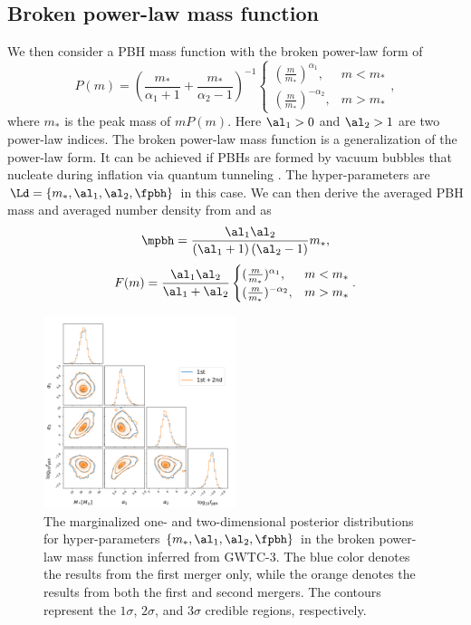\documentclass[
reprint,           %
superscriptaddress,%
amsmath,           %
amssymb,           %
aps,               %
prd,               %
notitlepage,       %
longbibliography,  %
floatfix,          %
nofootinbib,
]{revtex4-1}
\def\({\left(}
\def\){\right)}
\def\e{\begin{equation}}
\def\q{\end{equation}}
\begin{document}
\subsection{Broken power-law mass function}
We then consider a PBH mass function with the broken power-law form of \cite{Deng:2021ezy}
\begin{equation}
	P(m)= \left(\frac{m_*}{\alpha_1+1} + \frac{m_*}{\alpha_2-1}\right)^{-1} \begin{cases} (\frac{m}{m_*})^{\alpha_1}, & m<m_* \\ (\frac{m}{m_*})^{-\alpha_2}, & m>m_*\end{cases},
\end{equation}
where $m_*$ is the peak mass of $m P(m)$. Here $\al_1>0$ and $\al_2>1$ are two power-law indices. The broken power-law mass function is a generalization of the power-law form. It can be achieved if PBHs are formed by vacuum bubbles that nucleate during inflation via quantum tunneling \cite{Deng:2021ezy}.
The hyper-parameters are $\Ld = \{m_*, \al_1, \al_2, \fpbh\}$ in this case. 
We can then derive the averaged PBH mass and averaged number density from  and  as
\e
\mpbh = \frac{\al_1 \al_2}{\(\al_1 +1\)\(\al_2 -1\)} m_*,
\q
\e 
F(m) = \frac{\al_1 \al_2}{\al_1 + \al_2} \begin{cases} (\frac{m}{m_*})^{\alpha_1}, & m<m_* \\ (\frac{m}{m_*})^{-\alpha_2}, & m>m_*\end{cases}.
\q

\begin{figure}[tbp!]
	\centering
	\includegraphics[width=0.5\textwidth]{post-bpower.pdf}
	\caption{\label{posterior-bpower}The marginalized one- and two-dimensional posterior distributions for hyper-parameters $\{m_*, \al_1, \al_2, \fpbh\}$ in the broken power-law mass function inferred from GWTC-3. The blue color denotes the results from the first merger only, while the orange denotes the results from both the first and second mergers. The contours represent the $1\sigma$, $2\sigma$, and $3\sigma$ credible regions, respectively.}
\end{figure}
\end{document}
